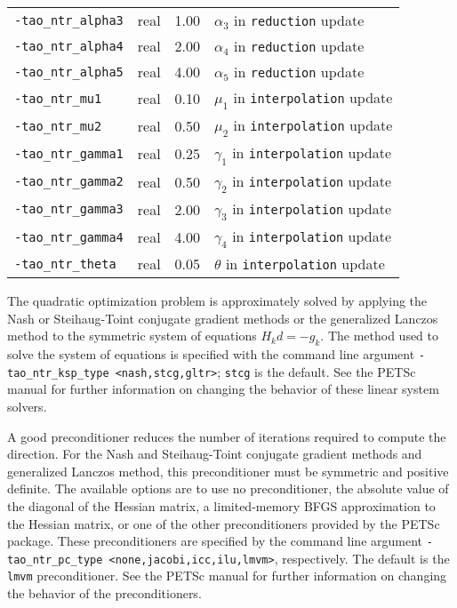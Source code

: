\begin{table}[h]
\begin{tabular}{l|p{1.5in}|l|p{2.0in}}
{\tt -tao\_ntr\_alpha3} & real & 1.00 & $\alpha_3$ in {\tt reduction} update \\
{\tt -tao\_ntr\_alpha4} & real & 2.00 & $\alpha_4$ in {\tt reduction} update \\
{\tt -tao\_ntr\_alpha5} & real & 4.00 & $\alpha_5$ in {\tt reduction} update \\
{\tt -tao\_ntr\_mu1} & real & 0.10 & $\mu_1$ in {\tt interpolation} update \\
{\tt -tao\_ntr\_mu2} & real & 0.50 & $\mu_2$ in {\tt interpolation} update \\
{\tt -tao\_ntr\_gamma1} & real & 0.25 & $\gamma_1$ in {\tt interpolation} update \\
{\tt -tao\_ntr\_gamma2} & real & 0.50 & $\gamma_2$ in {\tt interpolation} update \\
{\tt -tao\_ntr\_gamma3} & real & 2.00 & $\gamma_3$ in {\tt interpolation} update \\
{\tt -tao\_ntr\_gamma4} & real & 4.00 & $\gamma_4$ in {\tt interpolation} update \\
{\tt -tao\_ntr\_theta} & real & 0.05 & $\theta$ in {\tt interpolation} update \\
\hline
\end{tabular}
\end{table}
\afterpage{\clearpage}

The quadratic optimization problem is approximately solved by applying
the Nash or Steihaug-Toint conjugate gradient methods or the 
generalized Lanczos 
method to the symmetric system of equations $H_k d = -g_k$.  The method 
used to solve the system of equations is specified with the command line
argument {\tt -tao\_ntr\_ksp\_type <nash,stcg,gltr>}; {\tt stcg} is the default.  
See the PETSc manual for further information on changing the behavior of 
these linear system solvers.  

A good preconditioner reduces the number of iterations required to
compute the direction.  For the Nash and Steihaug-Toint conjugate gradient
methods and generalized Lanczos method, this preconditioner must be
symmetric and positive definite.  The available options are to use no
preconditioner, the absolute value of the diagonal of the Hessian
matrix, a limited-memory BFGS approximation to the Hessian matrix, or
one of the other preconditioners provided by the PETSc package.  These
preconditioners are specified by the command line argument 
{\tt -tao\_ntr\_pc\_type <none,jacobi,icc,ilu,lmvm>}, respectively.  The
default is the {\tt lmvm} preconditioner. See the PETSc manual 
for further information on changing the behavior of the preconditioners.

